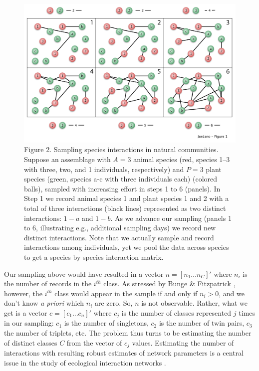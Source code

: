 \documentclass[a4paper,12pt]{article}
\begin{document}
\begin{spacing}{1.0}
\begin{figure}[htbp]
\centering
\includegraphics[keepaspectratio,width=\textwidth,height=0.75\textheight]{../figures/Fig2.pdf}
\caption{Figure 2. Sampling species interactions in natural communities. Suppose an assemblage with $A= 3$ animal species (red, species 1--3 with three, two, and 1 individuals, respectively) and $P= 3$ plant species (green, species a-c with three individuals each) (colored balls), sampled with increasing effort in steps 1 to 6 (panels). In Step 1 we record animal species 1 and plant species 1 and 2 with a total of three interactions (black lines) represented as two distinct interactions: $1-a$ and $1-b$. As we advance our sampling (panels 1 to 6, illustrating e.g., additional sampling days) we record new distinct interactions. Note that we actually sample and record interactions among individuals, yet we pool the data across species to get a species by species interaction matrix.}
\end{figure}

Our sampling above would have resulted in a vector $n= [n_1 ... n_C]'$ where $n_i$ is the number of records in the $i^{th}$ class. As stressed by Bunge \& Fitzpatrick \citep{Bunge:1993ux}, however, the $i^{th}$ class would appear in the sample if and only if $n_i > 0$, and we don't know \emph{a priori} which $n_i$ are zero. So, $n$ is not observable. Rather, what we get is a vector $c= [c_1 ... c_n]'$ where $c_j$ is the number of classes represented $j$ times in our sampling: $c_1$ is the number of singletons, $c_2$ is the number of twin pairs, $c_3$ the number of triplets, etc. The problem thus turns to be estimating the number of distinct classes $C$ from the vector of $c_j$ values.
 Estimating the number of interactions with resulting robust estimates of network parameters is a central issue in the study of ecological interaction networks \citep{E31/2562}\citep{Bascompte:2014to}.


\end{spacing}
\end{document}
